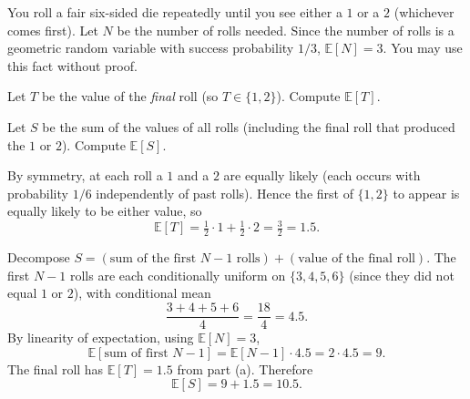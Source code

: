 \documentclass[test,letterpaper]{cs20}
\begin{document}
\begin{problem}

You roll a fair six-sided die repeatedly until you see either a $1$ or a $2$ (whichever comes first). Let $N$ be the number of rolls needed. Since the number of rolls is a geometric random variable with success probability $1/3$, $\mathbb{E}[N] = 3$. You may use this fact without proof.

\subproblem Let $T$ be the value of the \emph{final} roll (so $T \in \{1, 2\}$). Compute $\mathbb{E}[T]$.

\subproblem Let $S$ be the sum of the values of all rolls (including the final roll that produced the $1$ or $2$). Compute $\mathbb{E}[S]$.

\begin{solution}
\subsolution By symmetry, at each roll a $1$ and a $2$ are equally likely (each occurs with probability $1/6$ independently of past rolls). Hence the first of $\{1, 2\}$ to appear is equally likely to be either value, so
\[
\mathbb{E}[T] = \tfrac{1}{2}\cdot 1 + \tfrac{1}{2}\cdot 2 = \tfrac{3}{2} = 1.5.
\]

\subsolution Decompose $S = (\text{sum of the first } N - 1 \text{ rolls}) + (\text{value of the final roll})$. The first $N - 1$ rolls are each conditionally uniform on $\{3, 4, 5, 6\}$ (since they did not equal $1$ or $2$), with conditional mean
\[
\frac{3 + 4 + 5 + 6}{4} = \frac{18}{4} = 4.5.
\]
By linearity of expectation, using $\mathbb{E}[N] = 3$,
\[
\mathbb{E}[\text{sum of first } N-1] = \mathbb{E}[N - 1] \cdot 4.5 = 2 \cdot 4.5 = 9.
\]
The final roll has $\mathbb{E}[T] = 1.5$ from part (a). Therefore
\[
\mathbb{E}[S] = 9 + 1.5 = 10.5.
\]
\end{solution}

\pagebreak

\end{problem}
\end{document}
